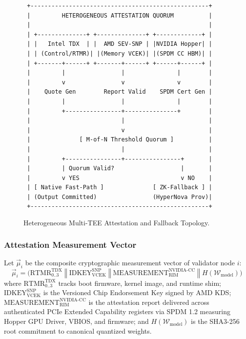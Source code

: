 \documentclass[10pt,twocolumn,letterpaper]{article}
\begin{document}
\begin{figure}[htbp]
\centering
\begin{verbatim}
 +---------------------------------------------------+
 |         HETEROGENEOUS ATTESTATION QUORUM          |
 |                                                   |
 | +--------------+ +--------------+ +-------------+ |
 | |   Intel TDX  | |  AMD SEV-SNP | |NVIDIA Hopper| |
 | | (Control/RTMR)| |(Memory VCEK)| |(SPDM CC HBM)| |
 | +-------+------+ +-------+------+ +------+------+ |
 |         |                |               |        |
 |         v                v               v        |
 |    Quote Gen        Report Valid    SPDM Cert Gen |
 |         |                |               |        |
 |         +----------------+---------------+        |
 |                          |                        |
 |                          v                        |
 |              [ M-of-N Threshold Quorum ]          |
 |                          |                        |
 |         +----------------+----------------+       |
 |         | Quorum Valid?                   |       |
 |         v YES                             v NO    |
 | [ Native Fast-Path ]              [ ZK-Fallback ] |
 | (Output Committed)                (HyperNova Prov)|
 +---------------------------------------------------+
\end{verbatim}
\caption{Heterogeneous Multi-TEE Attestation and Fallback Topology.}
\label{fig:multi_tee}
\end{figure}

\subsubsection{Attestation Measurement Vector}
Let $\vec{\mu}_i$ be the composite cryptographic measurement vector of validator node $i$:
\begin{equation}
\vec{\mu}_i = \Big( \text{RTMR}_{0..3}^{\text{TDX}} \;\mathbin{\Vert}\; \text{IDKEY}_{\text{VCEK}}^{\text{SNP}} \;\mathbin{\Vert}\; \text{MEASUREMENT}_{\text{RIM}}^{\text{NVIDIA-CC}} \;\mathbin{\Vert}\; H(\mathcal{W}_{\text{model}}) \Big)
\end{equation}
where $\text{RTMR}_{0..3}^{\text{TDX}}$ tracks boot firmware, kernel image, and runtime shim; $\text{IDKEY}_{\text{VCEK}}^{\text{SNP}}$ is the Versioned Chip Endorsement Key signed by AMD KDS; $\text{MEASUREMENT}_{\text{RIM}}^{\text{NVIDIA-CC}}$ is the attestation report delivered across authenticated PCIe Extended Capability registers via SPDM 1.2 measuring Hopper GPU Driver, VBIOS, and firmware; and $H(\mathcal{W}_{\text{model}})$ is the SHA3-256 root commitment to canonical quantized weights.
\end{document}
